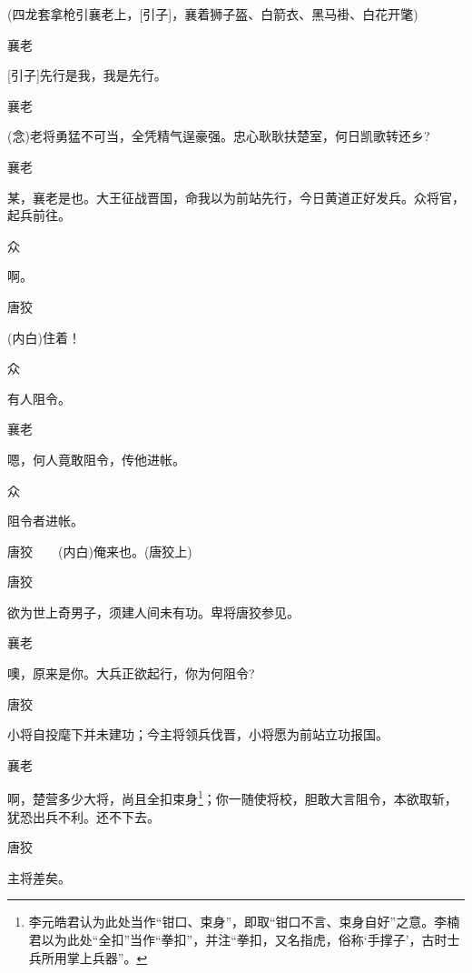{(四龙套拿枪引襄老上，{[}{\akai 引子}{]}，襄着狮子盔、白箭衣、黑马褂、白花开氅)

襄老\hspace{30pt}~

{[}{\akai 引子}{]}先行是我，我是先行。

襄老\hspace{30pt}~

({\akai 念})老将勇猛不可当，全凭精气逞豪强。忠心耿耿扶楚室，何日凯歌转还乡?

襄老

某，襄老是也。大王征战晋国，命我以为前站先行，今日黄道正好发兵。众将官，起兵前往。

众\hspace{40pt}~

啊。

唐狡\hspace{30pt}~

({\akai 内}白)住着！

众\hspace{40pt}~

有人阻令。

襄老\hspace{30pt}~

嗯，何人竟敢阻令，传他进帐。

众\hspace{40pt}~

阻令者进帐。

唐狡　　({\akai 内}白)俺来也。(唐狡上)

唐狡\hspace{30pt}~

欲为世上奇男子，须建人间未有功。卑将唐狡参见。

襄老\hspace{30pt}~

噢，原来是你。大兵正欲起行，你为何阻令?

唐狡\hspace{30pt}~

小将自投麾下并未建功；今主将领兵伐晋，小将愿为前站立功报国。

襄老

啊，楚营多少大将，尚且全扣束身\footnote{ 李元皓君认为此处当作``钳口、束身''，即取``钳口不言、束身自好''之意。李楠君以为此处``全扣''当作``拳扣''，并注``拳扣，又名指虎，俗称`手撑子'，古时士兵所用掌上兵器''。}；你一随使将校，胆敢大言阻令，本欲取斩，犹恐出兵不利。还不下去。

唐狡\hspace{30pt}~

主将差矣。

}
